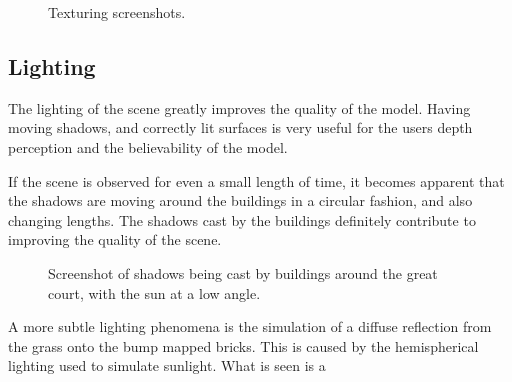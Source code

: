         \begin{figure}[H]
            \centering{}
            \caption{Texturing screenshots.}
            \label{fig:texture_examples}
        \end{figure}        

    \subsection{Lighting} %
    \label{sub:lighting}
        The lighting of the scene greatly improves the quality of the model.
        Having moving shadows, and correctly lit surfaces is very useful for the users depth perception and the believability of the model.

        If the scene is observed for even a small length of time, it becomes apparent that the shadows are moving around the buildings in a circular fashion, and also changing lengths.
        The shadows cast by the buildings definitely contribute to improving the quality of the scene.

        \begin{figure}[H]
            \centering
            \caption{
                Screenshot of shadows being cast by buildings around the great court, with the sun at a low angle.
            }
            \label{fig:shadows}
        \end{figure}

        A more subtle lighting phenomena is the simulation of a diffuse reflection from the grass onto the bump mapped bricks.
        This is caused by the hemispherical lighting used to simulate sunlight.
        What is seen is a

